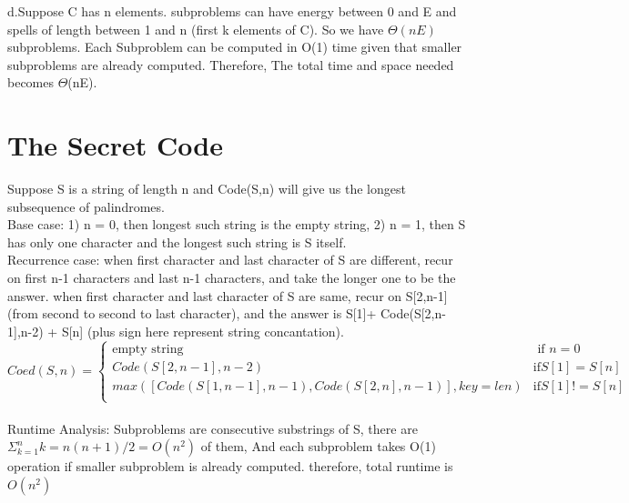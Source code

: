 \documentclass[12pt]{article}
\begin{document}
d.Suppose C has n elements. subproblems can have energy between 0 and E and spells of length between 1 and n (first  k elements of C).
So we have $\Theta(nE)$ subproblems. Each Subproblem can be computed in O(1) time given that smaller subproblems are already computed. Therefore, The total time and space needed becomes $\Theta$(nE).


\pagebreak
\section{The Secret Code}
Suppose S is a string of length n and Code(S,n) will give us the longest subsequence of palindromes.\\
Base case: 1) n = 0, then longest such string is the empty string, 2) n = 1, then S has only one character and the longest such string is S itself.\\
Recurrence case:  when first character and last character of S are different, recur on first n-1 characters and last n-1 characters, and take the longer one to be the answer. when first character and last character of S are same, recur on S[2,n-1] (from second to second to last character), and the answer is S[1]+ Code(S[2,n-1],n-2) + S[n] (plus sign here represent string concantation).\\
\[
    Coed(S,n)= 
\begin{cases}
    \text{empty string}  &\text{ if } n = 0 \\
    Code(S[2,n-1],n-2)       & \text{if} S[1] = S[n]\\
    max([Code(S[1,n-1],n-1), Code(S[2,n],n-1)] ,key = len)       & \text{if} S[1] != S[n]\\
\end{cases}
\]
\\
Runtime Analysis: Subproblems are consecutive substrings of S, there are $\Sigma_{k=1}^n k = n(n+1)/2 = O(n^2)$ of them, And each subproblem takes O(1) operation if smaller subproblem is already computed. therefore, total runtime is $O(n^2)$
\end{document}
